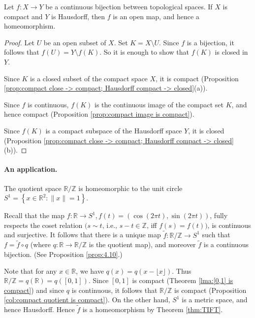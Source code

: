 \documentclass[a4paper]{article}
\begin{document}
\begin{theorem}\label{thm:TIFT}
    Let $f: X \rightarrow Y$ be a continuous bijection between topological spaces. If $X$ is compact and $Y$ is Hausdorff, then $f$ is an open map, and hence a homeomorphism.
\end{theorem}
\begin{proof}
    Let $U$ be an open subset of $X$. Set $K=X \setminus U$. Since $f$ is a bijection, it follows that $f(U)=Y \setminus f(K)$. So it is enough to show that $f(K)$ is closed in $Y$.

Since $K$ is a closed subset of the compact space $X$, it is compact (Proposition \ref{prop:compact close -> compact; Hausdorff compact -> closed}(a)).

Since $f$ is continuous, $f(K)$ is the continuous image of the compact set $K$, and hence compact (Proposition \ref{prop:compact image is compact}).

Since $f(K)$ is a compact subspace of the Hausdorff space $Y$, it is closed (Proposition \ref{prop:compact close -> compact; Hausdorff compact -> closed}(b)).
\end{proof}

\paragraph*{An application.} The quotient space $\mathbb{R} / \mathbb{Z}$ is homeomorphic to the unit circle $S^{1}=\left\{x \in \mathbb{R}^{2}:\|x\|=1\right\}$.

Recall that the map $f: \mathbb{R} \rightarrow S^{1}, f(t)=(\cos (2 \pi t), \sin (2 \pi t))$, fully respects the coset relation $(s \sim t$, i.e., $s-t \in \mathbb{Z}$, iff $f(s)=f(t))$, is continuous and surjective. It follows that there is a unique map $\tilde{f}: \mathbb{R} / \mathbb{Z} \rightarrow S^{1}$ such that $f=\tilde{f} \circ q$ (where $q: \mathbb{R} \rightarrow \mathbb{R} / \mathbb{Z}$ is the quotient map), and moreover $\tilde{f}$ is a continuous bijection. (See Proposition \ref{prop:4.10}.)

Note that for any $x \in \mathbb{R}$, we have $q(x)=q(x-\lfloor x\rfloor)$. Thus $\mathbb{R} / \mathbb{Z}=q(\mathbb{R})=q([0,1])$. Since $[0,1]$ is compact (Theorem \ref{lma:[0,1] is compact}) and since $q$ is continuous, it follows that $\mathbb{R} / \mathbb{Z}$ is compact (Proposition \ref{col:compact quotient is compact}). On the other hand, $S^{1}$ is a metric space, and hence Hausdorff. Hence $\tilde{f}$ is a homeomorphism by Theorem \ref{thm:TIFT}.
\end{document}
